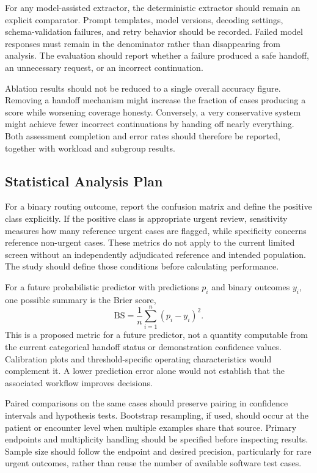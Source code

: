 \documentclass[conference]{IEEEtran}
\begin{document}
For any model-assisted extractor, the deterministic extractor should remain an explicit comparator. Prompt templates, model versions, decoding settings, schema-validation failures, and retry behavior should be recorded. Failed model responses must remain in the denominator rather than disappearing from analysis. The evaluation should report whether a failure produced a safe handoff, an unnecessary request, or an incorrect continuation.

Ablation results should not be reduced to a single overall accuracy figure. Removing a handoff mechanism might increase the fraction of cases producing a score while worsening coverage honesty. Conversely, a very conservative system might achieve fewer incorrect continuations by handing off nearly everything. Both assessment completion and error rates should therefore be reported, together with workload and subgroup results.

\subsection{Statistical Analysis Plan}
For a binary routing outcome, report the confusion matrix and define the positive class explicitly. If the positive class is appropriate urgent review, sensitivity measures how many reference urgent cases are flagged, while specificity concerns reference non-urgent cases. These metrics do not apply to the current limited screen without an independently adjudicated reference and intended population. The study should define those conditions before calculating performance.

For a future probabilistic predictor with predictions $p_i$ and binary outcomes $y_i$, one possible summary is the Brier score,
\begin{equation}
\mathrm{BS}=\frac{1}{n}\sum_{i=1}^{n}(p_i-y_i)^2.
\end{equation}
This is a proposed metric for a future predictor, not a quantity computable from the current categorical handoff status or demonstration confidence values. Calibration plots and threshold-specific operating characteristics would complement it. A lower prediction error alone would not establish that the associated workflow improves decisions.

Paired comparisons on the same cases should preserve pairing in confidence intervals and hypothesis tests. Bootstrap resampling, if used, should occur at the patient or encounter level when multiple examples share that source. Primary endpoints and multiplicity handling should be specified before inspecting results. Sample size should follow the endpoint and desired precision, particularly for rare urgent outcomes, rather than reuse the number of available software test cases.
\end{document}
